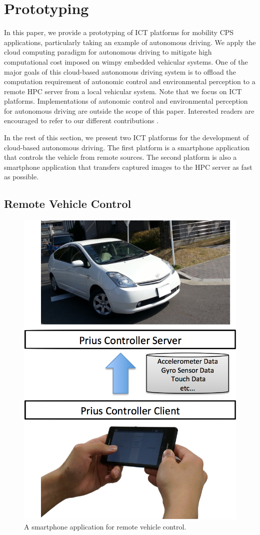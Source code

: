 \section{Prototyping}
\label{sec:prototype}

In this paper, we provide a prototyping of ICT platforms for mobility
CPS applications, particularly taking an example of autonomous driving.
We apply the cloud computing paradigm for autonomous driving to mitigate
high computational cost imposed on wimpy embedded vehicular systems.
One of the major goals of this cloud-based autonomous driving system is
to offload the computation requirement of autonomic control and
environmental perception to a remote HPC server from a local vehicular
system.
Note that we focus on ICT platforms.
Implementations of autonomic control and environmental perception for
autonomous driving are outside the scope of this paper.
Interested readers are encouraged to refer to our different
contributions \cite{Hirabayashi13, Kagami13}.

In the rest of this section, we present two ICT platforms for the
development of cloud-based autonomous driving.
The first platform is a smartphone application that controls the vehicle
from remote sources.
The second platform is also a smartphone application that transfers
captured images to the HPC server as fast as possible.

\subsection{Remote Vehicle Control}

\begin{figure}[!t]
 \centering
 \includegraphics[width=0.6\hsize]{fig/Andrive.pdf}
 \caption{A smartphone application for remote vehicle control.}
 \label{fig:andrive}
\end{figure}

